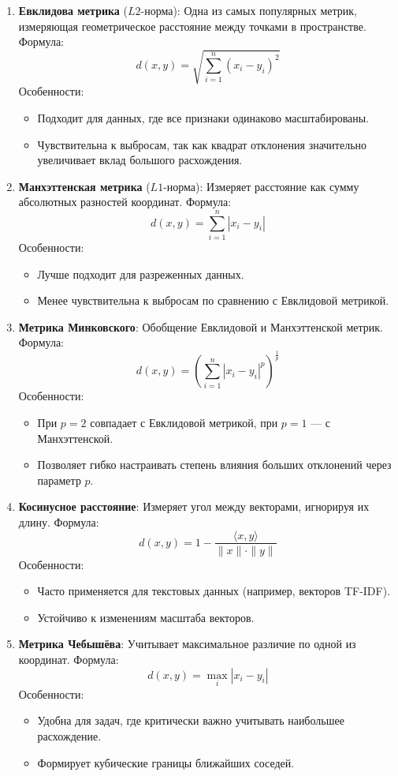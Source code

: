 \begin{enumerate}
    \item \textbf{Евклидова метрика} (\(L2\)-норма):  
    Одна из самых популярных метрик, измеряющая геометрическое расстояние между точками в пространстве.  
    Формула:
    \[
    d(x, y) = \sqrt{\sum_{i=1}^{n}(x_i - y_i)^2}
    \]
    Особенности:
    \begin{itemize}
        \item Подходит для данных, где все признаки одинаково масштабированы.
        \item Чувствительна к выбросам, так как квадрат отклонения значительно увеличивает вклад большого расхождения.
    \end{itemize}

    \item \textbf{Манхэттенская метрика} (\(L1\)-норма):  
    Измеряет расстояние как сумму абсолютных разностей координат.  
    Формула:
    \[
    d(x, y) = \sum_{i=1}^{n}|x_i - y_i|
    \]
    Особенности:
    \begin{itemize}
        \item Лучше подходит для разреженных данных.
        \item Менее чувствительна к выбросам по сравнению с Евклидовой метрикой.
    \end{itemize}

    \item \textbf{Метрика Минковского}:  
    Обобщение Евклидовой и Манхэттенской метрик.  
    Формула:
    \[
    d(x, y) = \left(\sum_{i=1}^{n}|x_i - y_i|^p\right)^{\frac{1}{p}}
    \]
    Особенности:
    \begin{itemize}
        \item При \(p=2\) совпадает с Евклидовой метрикой, при \(p=1\) — с Манхэттенской.
        \item Позволяет гибко настраивать степень влияния больших отклонений через параметр \(p\).
    \end{itemize}

    \item \textbf{Косинусное расстояние}:  
    Измеряет угол между векторами, игнорируя их длину.  
    Формула:
    \[
    d(x, y) = 1 - \frac{\langle x, y \rangle}{\|x\| \cdot \|y\|}
    \]
    Особенности:
    \begin{itemize}
        \item Часто применяется для текстовых данных (например, векторов TF-IDF).
        \item Устойчиво к изменениям масштаба векторов.
    \end{itemize}

    \item \textbf{Метрика Чебышёва}:  
    Учитывает максимальное различие по одной из координат.  
    Формула:
    \[
    d(x, y) = \max_{i}|x_i - y_i|
    \]
    Особенности:
    \begin{itemize}
        \item Удобна для задач, где критически важно учитывать наибольшее расхождение.
        \item Формирует кубические границы ближайших соседей.
    \end{itemize}
\end{enumerate}

